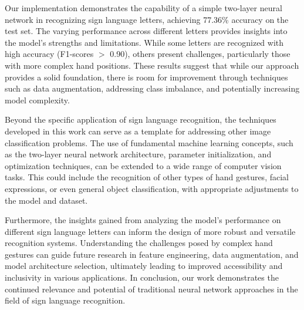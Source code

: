 \documentclass[times,final,english]{revdetua}
\begin{document}
Our implementation demonstrates the capability of a simple two-layer neural network in recognizing sign language letters, achieving 77.36\% accuracy on the test set. The varying performance across different letters provides insights into the model's strengths and limitations. While some letters are recognized with high accuracy (F1-scores $>$ 0.90), others present challenges, particularly those with more complex hand positions. These results suggest that while our approach provides a solid foundation, there is room for improvement through techniques such as data augmentation, addressing class imbalance, and potentially increasing model complexity.

Beyond the specific application of sign language recognition, the techniques developed in this work can serve as a template for addressing other image classification problems. The use of fundamental machine learning concepts, such as the two-layer neural network architecture, parameter initialization, and optimization techniques, can be extended to a wide range of computer vision tasks. This could include the recognition of other types of hand gestures, facial expressions, or even general object classification, with appropriate adjustments to the model and dataset.

Furthermore, the insights gained from analyzing the model's performance on different sign language letters can inform the design of more robust and versatile recognition systems. Understanding the challenges posed by complex hand gestures can guide future research in feature engineering, data augmentation, and model architecture selection, ultimately leading to improved accessibility and inclusivity in various applications.
In conclusion, our work demonstrates the continued relevance and potential of traditional neural network approaches in the field of sign language recognition. 
\end{document}
